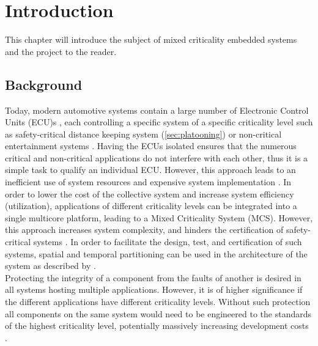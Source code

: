 \chapter{Introduction}
\label{sec:introduction}
This chapter will introduce the subject of mixed criticality embedded systems and the project to the reader.

\section{Background}
Today, modern automotive systems contain a large number of Electronic Control Units (ECU)s \cite{}, each controlling a specific system of a specific criticality level such as safety-critical distance keeping system (\ref{sec:platooning}) or non-critical entertainment systems \cite{}. Having the ECUs isolated ensures that the numerous critical and non-critical applications do not interfere with each other, thus it is a simple task to qualify an individual ECU. However, this approach leads to an inefficient use of system resources \cite{} and expensive system implementation \cite{}. In order to lower the cost of the collective system and increase system efficiency (utilization), applications of different criticality levels can be integrated into a single multicore platform, leading to a Mixed Criticality System (MCS). However, this approach increases system complexity, and hinders the certification of safety-critical systems \cite{}. In order to facilitate the design, test, and certification of such systems, spatial and temporal partitioning can be used in the architecture of the system as described by \cite{zaki2016}.\\

Protecting the integrity of a component from the faults of another is desired in all systems hosting multiple applications. However, it is of higher significance if the different applications have different criticality levels. Without such protection all components on the same system would need to be engineered to the standards of the highest criticality level, potentially massively increasing development costs \cite{burns2016}.

